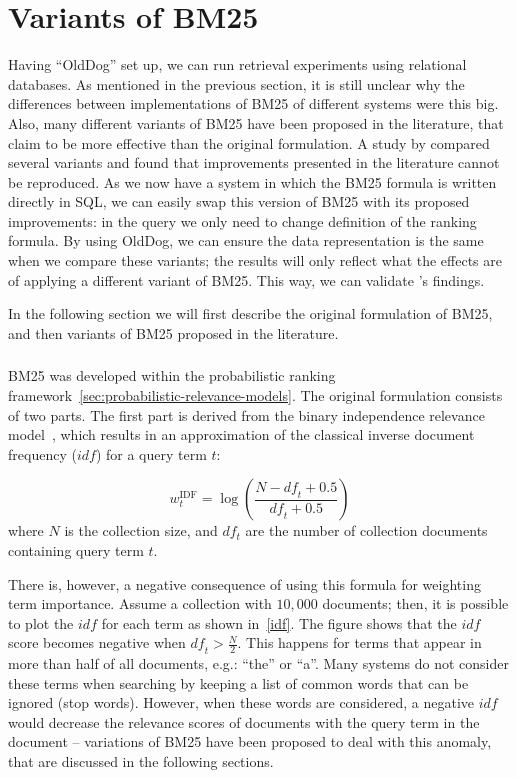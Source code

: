 \section{Variants of BM25}
\label{ir_db_variants}
Having ``OldDog'' set up, we can run retrieval experiments using relational databases. As mentioned in the previous section, it is still unclear why the differences between implementations of BM25 of different systems were this big. Also, many different variants of BM25 have been proposed in the literature, that claim to be more effective than the original formulation. A study by \citet{trotman-bm25} compared several variants and found that improvements presented in the literature cannot be reproduced. 
As we now have a system in which the BM25 formula is written directly in SQL, we can easily swap this version of BM25 with its proposed improvements: in the query we only need to change definition of the ranking formula. By using OldDog, we can ensure the data representation is the same when we compare these variants; the results will only reflect what the effects are of applying a different variant of BM25. This way, we can validate \citeauthor{trotman-bm25}'s findings.

In the following section we will first describe the original formulation of BM25, and then variants of BM25 proposed in the literature. 

\subsubsection{} 
BM25 was developed within the probabilistic ranking framework~\ref{sec:probabilistic-relevance-models}. The original formulation consists of two parts. The first part is derived from the binary independence relevance model~\citep{bm25-beyond}, which results in an approximation of the classical inverse document frequency ($\mathit{idf}$) for a query term $t$:

\begin{equation} 
	w_t^{\text{IDF}} = \log\left(\frac{N-\mathit{df}_t+0.5}{\mathit{df}_t+0.5}\right)
\end{equation}
where $N$ is the collection size, and $df_t$ are the number of collection documents containing query term $t$.  

There is, however, a negative consequence of using this formula for weighting term importance. Assume a collection with $10,000$ documents; then, it is possible to plot the $\mathit{idf}$ for each term as shown in~\cref{idf}. The figure shows that the $\mathit{idf}$ score becomes negative when $\mathit{df}_t > \frac{N}{2}$. This happens for terms that appear in more than half of all documents, e.g.: ``the'' or ``a''. Many systems do not consider these terms when searching by keeping a list of common words that can be ignored (stop words). However, when these words are considered,  a negative $\mathit{idf}$ would decrease the relevance scores of documents with the query term in the document -- variations of BM25 have been proposed to deal with this anomaly, that are discussed in the following sections. 

